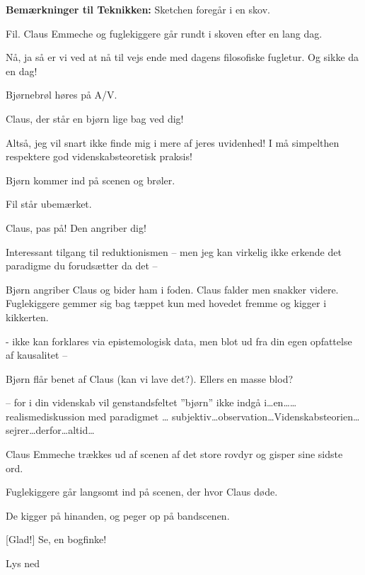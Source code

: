 \documentclass[a4paper,12pt]{article}
\begin{document}
\begin{sketch}



\scene \textbf{Bemærkninger til Teknikken:} Sketchen foregår i en skov.


\scene Fil. Claus Emmeche og fuglekiggere går rundt i skoven efter en lang dag.

Nå, ja så er vi ved at nå til vejs ende med dagens filosofiske fugletur. Og sikke da en dag! 

 Bjørnebrøl høres på A/V.

Claus, der står en bjørn lige bag ved dig!

Altså, jeg vil snart ikke finde mig i mere af jeres uvidenhed! I må simpelthen respektere god videnskabsteoretisk praksis!

\scene Bjørn kommer ind på scenen og brøler.

\scene Fil står ubemærket. 

Claus, pas på! Den angriber dig!

Interessant tilgang til reduktionismen -- men jeg kan virkelig ikke erkende det paradigme du forudsætter da det --

\scene Bjørn angriber Claus og bider ham i foden. Claus falder men snakker videre. Fuglekiggere gemmer sig bag tæppet kun med hovedet fremme og kigger i kikkerten.

- ikke kan forklares via epistemologisk data, men blot ud fra din egen opfattelse af kausalitet --

\scene Bjørn flår benet af Claus (kan vi lave det?). Ellers en masse blod?

-- for i din videnskab vil genstandsfeltet ''bjørn'' ikke indgå i\ldots en\ldots  {}\ldots  realismediskussion med paradigmet \ldots {} subjektiv\ldots observation\ldots Videnskabsteorien\ldots  sejrer\ldots  derfor\ldots altid\ldots 

\scene Claus Emmeche trækkes ud af scenen af det store rovdyr og gisper sine sidste ord.

\scene Fuglekiggere går langsomt ind på scenen, der hvor Claus døde.

\scene De kigger på hinanden, og peger op på bandscenen.

[Glad!] Se, en bogfinke!

\scene Lys ned


\end{sketch}
\end{document}
